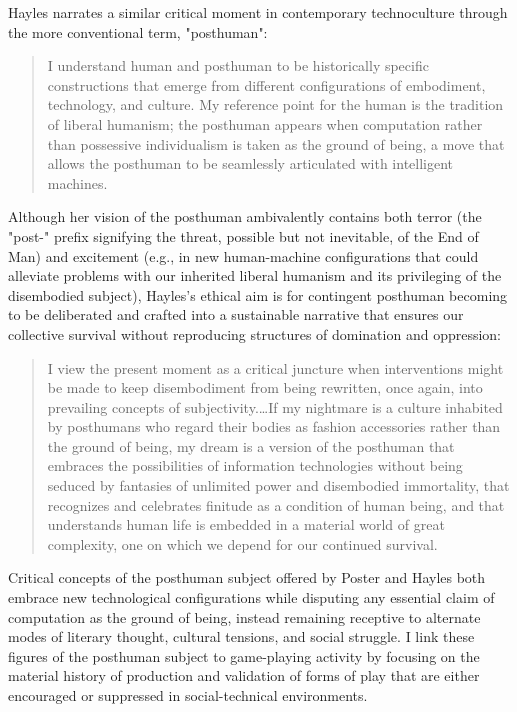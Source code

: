 Hayles narrates a similar critical moment in contemporary technoculture through the more conventional term, "posthuman":
\blockquote{
  I understand human and posthuman to be historically specific constructions that emerge from different configurations of embodiment, technology, and culture. My reference point for the human is the tradition of liberal humanism; the posthuman appears when computation rather than possessive individualism is taken as the ground of being, a move that allows the posthuman to be seamlessly articulated with intelligent machines. \autocite*[34]{Hayles1999-de}
}
Although her vision of the posthuman ambivalently contains both terror (the "post-" prefix signifying the threat, possible but not inevitable, of the End of Man) and excitement (e.g., in new human-machine configurations that could alleviate problems with our inherited liberal humanism and its privileging of the disembodied subject), Hayles's ethical aim is for contingent posthuman becoming to be deliberated and crafted into a sustainable narrative that ensures our collective survival without reproducing structures of domination and oppression:
\blockcquote[5]{Hayles1999-de}{
  I view the present moment as a critical juncture when interventions might be made to keep disembodiment from being rewritten, once again, into prevailing concepts of subjectivity.…If my nightmare is a culture inhabited by posthumans who regard their bodies as fashion accessories rather than the ground of being, my dream is a version of the posthuman that embraces the possibilities of information technologies without being seduced by fantasies of unlimited power and disembodied immortality, that recognizes and celebrates finitude as a condition of human being, and that understands human life is embedded in a material world of great complexity, one on which we depend for our continued survival.
}
Critical concepts of the posthuman subject offered by Poster and Hayles both embrace new technological configurations while disputing any essential claim of computation as the ground of being, instead remaining receptive to alternate modes of literary thought, cultural tensions, and social struggle. I link these figures of the posthuman subject to game-playing activity by focusing on the material history of production and validation of forms of play that are either encouraged or suppressed in social-technical environments.

